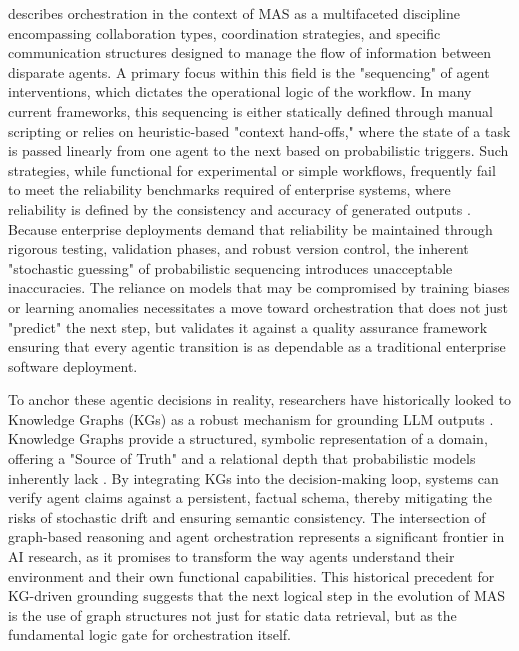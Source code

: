 \citet{tran2025multiagentcollaborationmechanismssurvey} describes orchestration in the context of MAS as a multifaceted discipline encompassing collaboration types, coordination strategies, and specific communication structures designed to manage the flow of information between disparate agents. A primary focus within this field is the "sequencing" of agent interventions, which dictates the operational logic of the workflow. In many current frameworks, this sequencing is either statically defined through manual scripting or relies on heuristic-based "context hand-offs," where the state of a task is passed linearly from one agent to the next based on probabilistic triggers. 
Such strategies, while functional for experimental or simple workflows, frequently fail to meet the reliability benchmarks required of enterprise systems, where reliability is defined by the consistency and accuracy of generated outputs \citep{menshawy2025llms}.
Because enterprise deployments demand that reliability be maintained through rigorous testing, validation phases, and robust version control, the inherent "stochastic guessing" of probabilistic sequencing introduces unacceptable inaccuracies. The reliance on models that may be compromised by training biases or learning anomalies necessitates a move toward orchestration that does not just "predict" the next step, but validates it against a quality assurance framework ensuring that every agentic transition is as dependable as a traditional enterprise software deployment.

To anchor these agentic decisions in reality, researchers have historically looked to Knowledge Graphs (KGs) as a robust mechanism for grounding LLM outputs \citep{kau2024combiningknowledgegraphslarge}. Knowledge Graphs provide a structured, symbolic representation of a domain, offering a "Source of Truth" and a relational depth that probabilistic models inherently lack \citep{Hogan_2021}. By integrating KGs into the decision-making loop, systems can verify agent claims against a persistent, factual schema, thereby mitigating the risks of stochastic drift and ensuring semantic consistency. The intersection of graph-based reasoning and agent orchestration represents a significant frontier in AI research, as it promises to transform the way agents understand their environment and their own functional capabilities. This historical precedent for KG-driven grounding suggests that the next logical step in the evolution of MAS is the use of graph structures not just for static data retrieval, but as the fundamental logic gate for orchestration itself.


